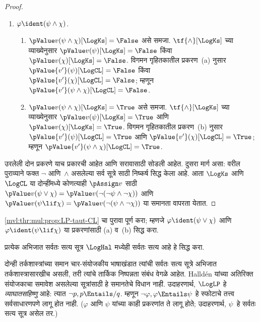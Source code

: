 \begin{proof}
\begin{enumerate}
    \item $\varphi \ident (\psi \land \chi)$.
    \begin{enumerate}
      \item $\pValue v(\psi \land \chi)[\LogKs] = \False$ असे समजा.
      $\tf{\land}[\LogKs]$ च्या व्याख्येनुसार
      $\pValue v(\psi)[\LogKs]  = \False$ किंवा
      $\pValue v(\chi)[\LogKs]  = \False$. विगमन गृहितकातील
      प्रकरण~(a) नुसार $\pValue {v'}(\psi)[\LogCL]  = \False$
      किंवा $\pValue {v'}(\chi)[\LogCL]  = \False$;
      म्हणून $\pValue {v'}(\psi \land \chi)[\LogCL] = \False$.
      \item $\pValue v(\psi \land \chi)[\LogKs] = \True$ असे समजा.
      $\tf{\land}[\LogKs]$ च्या व्याख्येनुसार
      $\pValue v(\psi)[\LogKs]  = \True$ आणि
      $\pValue v(\chi)[\LogKs]  = \True$. विगमन गृहितकातील
      प्रकरण~(b) नुसार $\pValue {v'}(\psi)[\LogCL]  = \True$
      आणि $\pValue {v'}(\chi)[\LogCL]  = \True$;
      म्हणून $\pValue {v'}(\psi \land \chi)[\LogCL] = \True$.
    \end{enumerate}
  \end{enumerate}

  उरलेली दोन प्रकरणे याच प्रकारची आहेत आणि सरावासाठी
  सोडली आहेत. दुसरा मार्ग असा: वरील पुराव्याने फक्त $\lnot$
  आणि~$\land$ असलेल्या सर्व सूत्रे साठी निष्कर्ष
  सिद्ध केला आहे. आता $\LogKs$ आणि $\LogCL$ या दोन्हींमध्ये
  कोणत्याही $\pAssign v$ साठी $\pValue v(\psi \lor
  \chi) = \pValue v(\lnot(\lnot\psi \land \lnot \chi))$ आणि $\pValue v(\psi \lif
  \chi) = \pValue v(\lnot(\psi \land \lnot \chi))$ या समानता
  वापरता येतात.
\end{proof}

\begin{prob}
  \ref{mvl:thr:mul:prop:LP-taut-CL} चा पुरावा पूर्ण
  करा; म्हणजे $\varphi \ident (\psi \lor \chi)$ आणि
  $\varphi \ident (\psi \lif \chi)$ या प्रकरणांसाठी (a) व~(b)
  सिद्ध करा.
\end{prob}

\begin{prob}
प्रत्येक अभिजात सर्वतः सत्य सूत्र $\LogHal$ मध्येही
सर्वतः सत्य आहे हे सिद्ध करा.
\end{prob}

दोन्ही तर्कशास्त्रांच्या समान चार-संयोजकीय भाषाखंडात त्यांची
सर्वतः सत्य सूत्रे अभिजात तर्कशास्त्रासारखीच असली, तरी त्यांचे
तार्किक निष्पन्नता संबंध वेगळे आहेत. Halld\'en यांच्या अतिरिक्त
संयोजकाचा समावेश असलेल्या सूत्रांसाठी हे समानतेचे विधान नाही. उदाहरणार्थ,
$\LogLP$ हे \emph{व्याघातसहिष्णु} आहे: त्यात
$\lnot p, p \Entails/ q$. म्हणून
$\lnot \varphi, \varphi \Entails \psi$ हे स्फोटाचे तत्त्व सर्वसाधारणपणे
लागू होत नाही. ($\varphi$ आणि $\psi$ यांच्या काही प्रकरणांत
ते लागू होते; उदाहरणार्थ, $\psi$~हे सर्वतः सत्य सूत्र असेल तर.)

